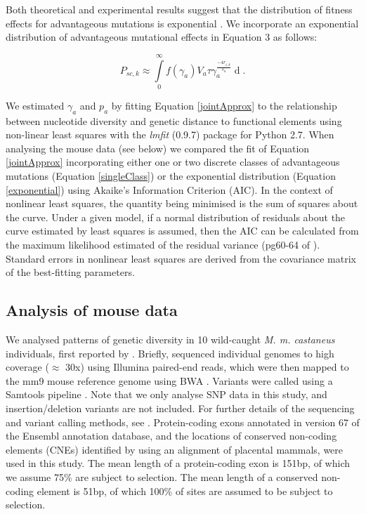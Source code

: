 	Both theoretical and experimental results suggest that the distribution of fitness effects for advantageous mutations is exponential \citep{RN109}. We incorporate an exponential distribution of advantageous mutational effects in Equation 3 as follows:

		\begin{equation}
		\label{exponential}
P_{sc,k} \approx \int \limits_{0}^{\infty} f(\gamma_a) V_a \tau\gamma_a^{\frac{-4r_{i,k}}{s_a}} \mathop{d\gamma_a}.
		\end{equation}

	We estimated $\gamma_a$ and $p_a$ by fitting Equation \ref{jointApprox} to the relationship between nucleotide diversity and genetic distance to functional elements using non-linear least squares with the \emph{lmfit} (0.9.7) package for Python 2.7. When analysing the mouse data (see below) we compared the fit of Equation \ref{jointApprox} incorporating either one or two discrete classes of advantageous mutations (Equation \ref{singleClass}) or the exponential distribution (Equation \ref{exponential}) using Akaike's Information Criterion (AIC). In the context of nonlinear least squares, the quantity being minimised is the sum of squares about the curve. Under a given model, if a normal distribution of residuals about the curve estimated by least squares is assumed, then the AIC can be calculated from the maximum likelihood estimated of the residual variance (pg60-64 of \citealt{RN393}). Standard errors in nonlinear least squares are derived from the covariance matrix of the best-fitting parameters.
		
	\subsection{Analysis of mouse data}

	We analysed patterns of genetic diversity in 10 wild-caught \textit{M. m. castaneus} individuals, first reported by \cite{RN122}. Briefly, \cite{RN122} sequenced individual genomes to high coverage ($\approx$ 30x) using Illumina paired-end reads, which were then mapped to the mm9 mouse reference genome using BWA \citep{RN251}. Variants were called using a Samtools pipeline \citep{RN252}. Note that we only analyse SNP data in this study, and insertion/deletion variants are not included. For further details of the sequencing and variant calling methods, see \cite{RN122}. Protein-coding exons annotated in version 67 of the Ensembl annotation database, and the locations of conserved non-coding elements (CNEs) identified by \cite{RN122} using an alignment of placental mammals, were used in this study. The mean length of a protein-coding exon is 151bp, of which we assume 75\% are subject to selection. The mean length of a conserved non-coding element is 51bp, of which 100\% of sites are assumed to be subject to selection.

